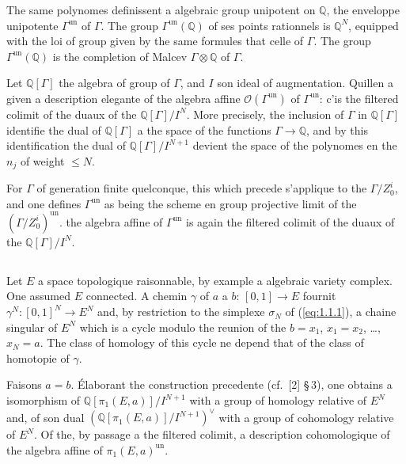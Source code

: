 \documentclass[11pt,a4paper]{article}
\theoremstyle{plain}
\theoremstyle{definition}
\newcommand{\Q}{\mathbb{Q}}
\begin{document}
The same polynomes definissent a algebraic group unipotent on $\Q$, the enveloppe unipotente $\Gamma^{\mathrm{un}}$ of $\Gamma$. The group $\Gamma^{\mathrm{un}}(\Q)$ of ses points rationnels is $\Q^N$, equipped with the loi of group given by the same formules that celle of $\Gamma$. The group $\Gamma^{\mathrm{un}}(\Q)$ is the completion of Malcev $\Gamma \otimes \Q$ of $\Gamma$.

Let $\Q[\Gamma]$ the algebra of group of $\Gamma$, and $I$ son ideal of augmentation. Quillen a given a description elegante of the algebra affine $\mathcal{O}(\Gamma^{\mathrm{un}})$ of $\Gamma^{\mathrm{un}}$: c'is the filtered colimit of the duaux of the $\Q[\Gamma]/I^N$. More precisely, the inclusion of $\Gamma$ in $\Q[\Gamma]$ identifie the dual of $\Q[\Gamma]$ a the space of the functions $\Gamma \to \Q$, and by this identification the dual of $\Q[\Gamma]/I^{N+1}$ devient the space of the polynomes en the $n_j$ of weight $\leq N$.

For $\Gamma$ of generation finite quelconque, this which precede s'applique to the $\Gamma/Z^i_0$, and one defines $\Gamma^{\mathrm{un}}$ as being the scheme en group projective limit of the $(\Gamma/Z^i_0)^{\mathrm{un}}$. the algebra affine of $\Gamma^{\mathrm{un}}$ is again the filtered colimit of the duaux of the $\Q[\Gamma]/I^N$.

\subsection{}\label{ssec:2.2}

Let $E$ a space topologique raisonnable, by example a algebraic variety complex. One assumed $E$ connected. A chemin $\gamma$ of $a$ a $b$: $[0,1] \to E$ fournit $\gamma^N: [0,1]^N \to E^N$ and, by restriction to the simplexe $\sigma_N$ of (\ref{eq:1.1.1}), a chaine singular of $E^N$ which is a cycle modulo the reunion of the $b = x_1$, $x_1 = x_2$, \ldots, $x_N = a$. The class of homology of this cycle ne depend that of the class of homotopie of $\gamma$.

Faisons $a = b$. \'Elaborant the construction precedente (cf.~[2] \S\,3), one obtains a isomorphism of $\Q[\pi_1(E,a)]/I^{N+1}$ with a group of homology relative of $E^N$ and, of son dual $(\Q[\pi_1(E,a)]/I^{N+1})^\vee$ with a group of cohomology relative of $E^N$. Of the, by passage a the filtered colimit, a description cohomologique of the algebra affine of $\pi_1(E,a)^{\mathrm{un}}$.
\end{document}
